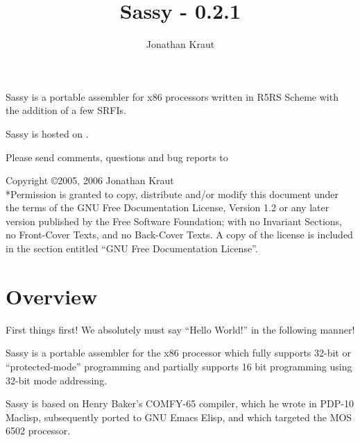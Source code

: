 \documentclass[11pt]{book}
\def\chapterl#1{
\chapter{#1}
\label{#1}
\index{#1}
}
\begin{document}
\title{Sassy - 0.2.1}
\author{Jonathan Kraut}
\maketitle

\centerline{Sassy is a portable assembler for x86 processors written in R5RS Scheme with the addition of a few SRFIs.}

\centerline{}
\centerline{Sassy is hosted on .}

\centerline{Please send comments, questions and bug reports to}
\centerline{}

\pagebreak

Copyright \copyright 2005, 2006 Jonathan Kraut
\\*Permission is granted to copy, distribute and/or modify this document
under the terms of the GNU Free Documentation License, Version 1.2 or
any later version published by the Free Software Foundation; with no
Invariant Sections, no Front-Cover Texts, and no Back-Cover Texts.  A
copy of the license is included in the section entitled ``GNU Free
Documentation License''.

\tableofcontents


\chapterl{Overview}

First things first! We absolutely must say ``Hello World!'' in the
following manner!


Sassy is a portable assembler for the x86 processor which fully supports
32-bit or ``protected-mode'' programming and partially supports 16
bit programming using 32-bit mode addressing.

Sassy is based
on Henry Baker's COMFY-65 compiler, which he wrote in PDP-10
Maclisp, subsequently ported to GNU Emacs Elisp, and which targeted the
MOS 6502 processor.
\end{document}
